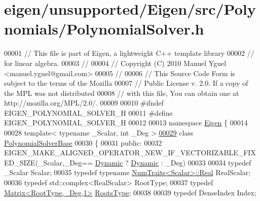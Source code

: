 \hypertarget{eigen_2unsupported_2_eigen_2src_2_polynomials_2_polynomial_solver_8h_source}{}\section{eigen/unsupported/\+Eigen/src/\+Polynomials/\+Polynomial\+Solver.h}
\label{eigen_2unsupported_2_eigen_2src_2_polynomials_2_polynomial_solver_8h_source}

\begin{DoxyCode}
00001 \textcolor{comment}{// This file is part of Eigen, a lightweight C++ template library}
00002 \textcolor{comment}{// for linear algebra.}
00003 \textcolor{comment}{//}
00004 \textcolor{comment}{// Copyright (C) 2010 Manuel Yguel <manuel.yguel@gmail.com>}
00005 \textcolor{comment}{//}
00006 \textcolor{comment}{// This Source Code Form is subject to the terms of the Mozilla}
00007 \textcolor{comment}{// Public License v. 2.0. If a copy of the MPL was not distributed}
00008 \textcolor{comment}{// with this file, You can obtain one at http://mozilla.org/MPL/2.0/.}
00009 
00010 \textcolor{preprocessor}{#ifndef EIGEN\_POLYNOMIAL\_SOLVER\_H}
00011 \textcolor{preprocessor}{#define EIGEN\_POLYNOMIAL\_SOLVER\_H}
00012 
00013 \textcolor{keyword}{namespace }\hyperlink{namespace_eigen}{Eigen} \{ 
00014 
00028 \textcolor{keyword}{template}< \textcolor{keyword}{typename} \_Scalar, \textcolor{keywordtype}{int} \_Deg >
\hyperlink{class_eigen_1_1_polynomial_solver_base}{00029} \textcolor{keyword}{class }\hyperlink{class_eigen_1_1_polynomial_solver_base}{PolynomialSolverBase}
00030 \{
00031   \textcolor{keyword}{public}:
00032     EIGEN\_MAKE\_ALIGNED\_OPERATOR\_NEW\_IF\_VECTORIZABLE\_FIXED\_SIZE(\_Scalar,\_Deg==
      \hyperlink{namespace_eigen_ad81fa7195215a0ce30017dfac309f0b2}{Dynamic} ? \hyperlink{namespace_eigen_ad81fa7195215a0ce30017dfac309f0b2}{Dynamic} : \_Deg)
00033 
00034     \textcolor{keyword}{typedef} \_Scalar                             Scalar;
00035     \textcolor{keyword}{typedef} \textcolor{keyword}{typename} \hyperlink{group___core___module_struct_eigen_1_1_num_traits}{NumTraits<Scalar>::Real}    RealScalar;
00036     \textcolor{keyword}{typedef} std::complex<RealScalar>            RootType;
00037     \textcolor{keyword}{typedef} \hyperlink{group___core___module}{Matrix<RootType,\_Deg,1>}             \hyperlink{group___core___module}{RootsType};
00038 
00039     \textcolor{keyword}{typedef} DenseIndex Index;

\end{DoxyCode}
